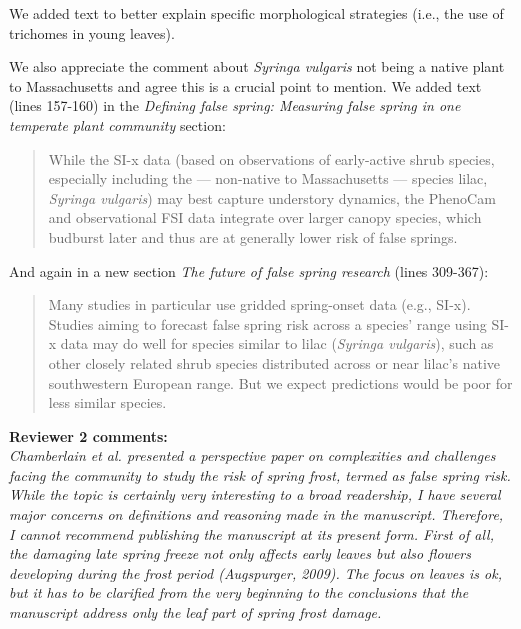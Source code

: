 \documentclass[11pt,a4paper]{article}
\begin{document}
We added text to better explain specific morphological strategies (i.e., the use of trichomes in young leaves). 

We also appreciate the comment about \textit{Syringa vulgaris} not being a native plant to Massachusetts and agree this is a crucial point to mention. We added text (lines 157-160) in the \textit{Defining false spring: Measuring false spring in one temperate plant community} section:\\

\begin{quotation}
While the SI-x data (based on observations of early-active shrub species, especially including the --- non-native to Massachusetts --- species lilac, \emph{Syringa vulgaris}) may best capture understory dynamics, the PhenoCam and observational FSI data integrate over larger canopy species, which budburst later and thus are at generally lower risk of false springs.
\end{quotation}

And again in a new section \textit{The future of false spring research} (lines 309-367):

\begin{quotation}
Many studies in particular use gridded spring-onset data (e.g., SI-x). Studies aiming to forecast false spring risk across a species' range using SI-x data may do well for species similar to lilac (\emph{Syringa vulgaris}), such as other closely related shrub species distributed across or near lilac's native southwestern European range. But we expect predictions would be poor for less similar species.
\end{quotation}

\textbf {Reviewer 2 comments:} \\

\textit{Chamberlain et al. presented a perspective paper on complexities and challenges facing the community to study the risk of spring frost, termed as false spring risk. While the topic is certainly very interesting to a broad readership, I have several major concerns on definitions and reasoning made in the manuscript. Therefore, I cannot recommend publishing the manuscript at its present form. First of all, the damaging late spring freeze not only affects early leaves but also flowers developing during the frost period (Augspurger, 2009). The focus on leaves is ok, but it has to be clarified from the very beginning to the conclusions that the manuscript address only the leaf part of spring frost damage.}\\
\end{document}
